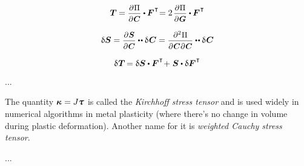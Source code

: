 \begin{otherlanguage}{russian}
\begin{equation*}
\firstpiolakirchhoffstress \hspace{-0.1ex}
= \scalebox{0.92}{$ \displaystyle \frac{\partial \hspace{.1ex} \Pi}{\raisemath{-0.1em}{\partial \hspace{.1ex} \bm{C}}} $} \dotp \hspace{-0.1ex} \bm{F}^{\hspace{.1ex}\T} \hspace{-0.5ex}
= 2 \hspace{.25ex} \scalebox{0.92}{$ \displaystyle \frac{\partial \hspace{.1ex} \Pi}{\raisemath{-0.1em}{\partial \hspace{.1ex} \bm{G}}} $} \dotp \hspace{-0.1ex} \bm{F}^{\hspace{.1ex}\T}
\end{equation*}

\begin{equation*}
\variation{\secondpiolakirchhoffstress}
= \scalebox{0.92}{$ \displaystyle \frac{\partial \hspace{.1ex} \bm{S}}{\raisemath{-0.1em}{\partial \hspace{.1ex} \bm{C}}} $} \dotdotp \variation{\hspace{.12ex}\bm{C}}
= \scalebox{0.92}{$ \displaystyle \frac{\partial^2 \hspace{0.1ex} \Pi}{\raisemath{-0.1em}{\partial \hspace{0.1ex} \bm{C} \hspace{0.1ex} \partial \hspace{0.1ex} \bm{C}}} $} \dotdotp \variation{\hspace{.12ex}\bm{C}}
\end{equation*}

\begin{equation*}
\variation{\hspace{.1ex}\firstpiolakirchhoffstress} \hspace{-0.2ex} =
\variation{\secondpiolakirchhoffstress} \dotp \bm{F}^{\hspace{.1ex}\T} \hspace{-0.4ex} + \hspace{.1ex}
\secondpiolakirchhoffstress \dotp \variation{\bm{F}}^{\hspace{.1ex}\T}
\end{equation*}

...

{\small
The quantity ${\bm{\kappa} = J \cauchystress}$ is called the \emph{Kirchhoff stress tensor} and is used widely in numerical algorithms in metal plasticity (where there’s no change in volume during plastic deformation). Another name for it is \emph{weighted Cauchy stress tensor}.
\par}

...

\end{otherlanguage}

